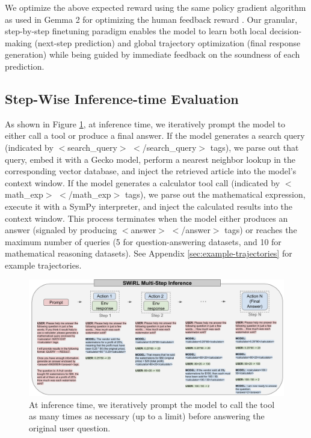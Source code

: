 \documentclass{article} %
\begin{document}
We optimize the above expected reward using the same policy gradient algorithm as used in Gemma 2 for optimizing the human feedback reward \citep{gemma2024gemmaopenmodelsbased, gemma2024gemma2improvingopen}. Our granular, step-by-step finetuning paradigm enables the model to learn both local decision-making (next-step prediction) and global trajectory optimization (final response generation) while being guided by immediate feedback on the soundness of each prediction.

\subsection{Step-Wise Inference-time Evaluation}
\label{sec:swirl-inference}

As shown in Figure \ref{fig:swirl-inference}, at inference time, we iteratively prompt the model to either call a tool or produce a final answer. If the model generates a search query (indicated by $<$search\_query$>$ $<$/search\_query$>$ tags), we parse out that query, embed it with a Gecko model, perform a nearest neighbor lookup in the corresponding vector database, and inject the retrieved article into the model's context window. If the model generates a calculator tool call (indicated by $<$math\_exp$>$ $<$/math\_exp$>$ tags), we parse out the mathematical expression, execute it with a SymPy interpreter, and inject the calculated results into the context window. This process terminates when the model either produces an answer (signaled by producing $<$answer$>$ $<$/answer$>$ tags) or reaches the maximum number of queries (5 for question-answering datasets, and 10 for mathematical reasoning datasets). See Appendix \ref{sec:example-trajectories} for example trajectories.

\begin{figure}[htbp!]
    \centering
    \includegraphics[width=1.0\textwidth]{swirl-inference.png}
    \caption{At inference time, we iteratively prompt the model to call the tool as many times as necessary (up to a limit) before answering the original user question.}
    \label{fig:swirl-inference}
\end{figure}
\end{document}
